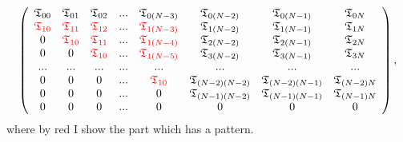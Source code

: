 \documentclass[prd,nofootinbib,eqsecnum,final]{revtex4}
\renewcommand{\(}{\left(}
\renewcommand{\)}{\right)}
\renewcommand{\[}{\left[}
\renewcommand{\]}{\right]}
\newcommand{\red}[1]{{\color[rgb]{1,0,0} #1}}
\begin{document}
\begin{eqnarray}
\left(
\begin{array}{cccccccc}
\mathfrak{T}_{00} & \mathfrak{T}_{01} & \mathfrak{T}_{02} & ... & \mathfrak{T}_{0(N-3)} & \mathfrak{T}_{0(N-2)} & \mathfrak{T}_{0(N-1)} & \mathfrak{T}_{0N}
\\
\red{\mathfrak{T}_{10}} & \red{\mathfrak{T}_{11}} & \red{\mathfrak{T}_{12}} & ... & \red{\mathfrak{T}_{1(N-3)}} & \mathfrak{T}_{1(N-2)} & \mathfrak{T}_{1(N-1)} & \mathfrak{T}_{1N}
\\
0 & \red{\mathfrak{T}_{10}} & \red{\mathfrak{T}_{11}} & ... & \red{\mathfrak{T}_{1(N-4)}} & \mathfrak{T}_{2(N-2)} & \mathfrak{T}_{2(N-1)} & \mathfrak{T}_{2N}
\\
0 & 0 & \red{\mathfrak{T}_{10}} & ... & \red{\mathfrak{T}_{1(N-5)}} & \mathfrak{T}_{3(N-2)} & \mathfrak{T}_{3(N-1)} & \mathfrak{T}_{3N}
\\ ... & ... &... &... &... &... &... &... 
\\
0 & 0 & 0 & ... & \red{\mathfrak{T}_{10}} & \mathfrak{T}_{(N-2)(N-2)} & \mathfrak{T}_{(N-2)(N-1)} & \mathfrak{T}_{(N-2)N}
\\
0 & 0 & 0 & ... & 0 & \mathfrak{T}_{(N-1)(N-2)} & \mathfrak{T}_{(N-1)(N-1)} & \mathfrak{T}_{(N-1)N}
\\
0 & 0 & 0 & ... & 0 & 0 & 0 & 0
\end{array}
\right),
\end{eqnarray}
where by red I show the part which has a pattern.
\end{document}
